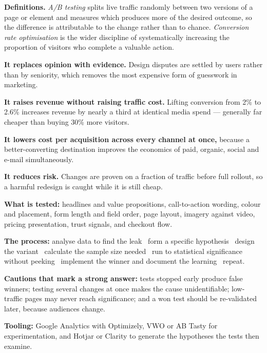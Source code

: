 \begin{qlist}
\textbf{Definitions.} \emph{A/B testing} splits live traffic randomly between
two versions of a page or element and measures which produces more of the
desired outcome, so the difference is attributable to the change rather than to
chance. \emph{Conversion rate optimisation} is the wider discipline of
systematically increasing the proportion of visitors who complete a valuable
action.

\begin{apts}
\item \textbf{It replaces opinion with evidence.} Design disputes are settled by
      users rather than by seniority, which removes the most expensive form of
      guesswork in marketing.
\item \textbf{It raises revenue without raising traffic cost.} Lifting
      conversion from 2\% to 2.6\% increases revenue by nearly a third at
      identical media spend --- generally far cheaper than buying 30\% more
      visitors.
\item \textbf{It lowers cost per acquisition across every channel at once,}
      because a better-converting destination improves the economics of paid,
      organic, social and e-mail simultaneously.
\item \textbf{It reduces risk.} Changes are proven on a fraction of traffic
      before full rollout, so a harmful redesign is caught while it is still
      cheap.
\item \textbf{What is tested:} headlines and value propositions, call-to-action
      wording, colour and placement, form length and field order, page layout,
      imagery against video, pricing presentation, trust signals, and checkout
      flow.
\item \textbf{The process:} analyse data to find the leak \ra\ form a specific
      hypothesis \ra\ design the variant \ra\ calculate the sample size needed
      \ra\ run to statistical significance without peeking \ra\ implement the
      winner and document the learning \ra\ repeat.
\item \textbf{Cautions that mark a strong answer:} tests stopped early produce
      false winners; testing several changes at once makes the cause
      unidentifiable; low-traffic pages may never reach significance; and a
      won test should be re-validated later, because audiences change.
\item \textbf{Tooling:} Google Analytics with Optimizely, VWO or AB Tasty for
      experimentation, and Hotjar or Clarity to generate the hypotheses the
      tests then examine.
\end{apts}


\end{qlist}
